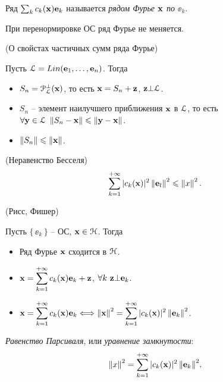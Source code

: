 \begin{definition}
    Ряд $\sum_k{c_k(\mathbf{x}) \mathbf{e}_k}$ называется \textit{рядом Фурье $\mathbf{x}$ по $\ee_k$}. 
\end{definition}

\begin{remark}
    При перенормировке ОС ряд Фурье не меняется.
\end{remark}

\begin{theorem}(О свойстах частичных сумм ряда Фурье)

    Пусть $\mathcal{L} = Lin(\mathbf{e}_1, \ldots, \mathbf{e}_n)$. Тогда
    \begin{itemize}
        \item $S_n = \mathcal{P}^\bot_{\mathcal{L}}(\mathbf{x})$, то есть $\mathbf{x} = S_n + \mathbf{z}$, $\mathbf{z} \bot \mathcal{L}$.
        \item $S_n$ -- элемент наилучшего приближения $\mathbf{x}$ в $\mathcal{L}$, то есть
            $\forall \mathbf{y} \in \mathcal{L}~ \left\lVert S_n - \mathbf{x}\right\rVert \leqslant \left\lVert\mathbf{y} - \mathbf{x}\right\rVert$.
        \item $\left\lVert S_n\right\rVert \leqslant \left\lVert\mathbf{x}\right\rVert$.
    \end{itemize} 
\end{theorem}

\begin{corollary}(Неравенство Бесселя)
\[
    \sum_{k = 1}^{+\infty}{|c_k(\mathbf{x})|^2 \left\lVert\mathbf{e}_l\right\rVert^2} \leqslant \left\lVert x\right\rVert^2
.\] 
\end{corollary}

\begin{theorem}(Рисс, Фишер)

    Пусть $\{\,\ee_k\,\}$ -- ОС, $\mathbf{x} \in \mathcal{H}$. Тогда
    \begin{itemize}
        \item Ряд Фурье $\mathbf{x}$ сходится в $\mathcal{H}$.
        \item $\displaystyle \mathbf{x} = \sum_{k = 1}^{+\infty}{c_k(\mathbf{x}) \mathbf{e}_k} + \mathbf{z}$, $\forall k~ \mathbf{z} \bot \mathbf{e}_k$.
        \item $\displaystyle \mathbf{x} = \sum_{k = 1}^{+\infty}{c_k(\mathbf{x}) \mathbf{e}_k} \Longleftrightarrow \left\lVert\mathbf{x}\right\rVert^2 = 
            \sum_{k = 1}^{+\infty}{|c_k(\mathbf{x})|^2 \left\lVert\mathbf{e}_k\right\rVert^2}$.
    \end{itemize} 
\end{theorem}

\begin{definition}
    \textit{Равенство Парсиваля}, или \textit{уравнение замкнутости}:
\[
    \left\lVert x\right\rVert^2 = \sum_{k = 1}^{+\infty}{|c_k(\mathbf{x})|^2 \left\lVert\mathbf{e}_k\right\rVert^2}
.\] 
\end{definition}

